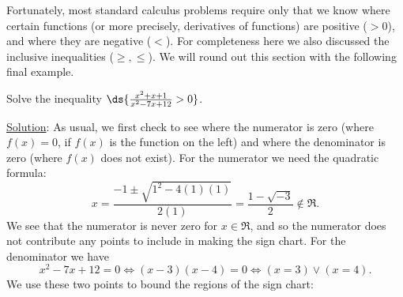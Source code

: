 %
\label{Example:SecondRational}
\eex

Fortunately, most standard calculus problems require only that
we know where certain functions (or more precisely, derivatives
of functions) are positive ($>0$), and where they are negative ($<$).
For completeness here we also discussed the inclusive
inequalities ($\ge,\le$).  We will round out this section with 
the following final example.

\bex Solve the inequality $\ds{\frac{x^2+x+1}{x^2-7x+12}>0}$.

\underline{Solution}: As usual, we first check to see where 
the numerator is zero (where $f(x)=0$, if $f(x)$ is the
function on the left) and where
the denominator is zero (where $f(x)$ does not exist).
For the numerator we need the quadratic formula:
$$x=\frac{-1\pm\sqrt{1^2-4(1)(1)}}{2(1)}=\frac{1-\sqrt{-3}}{2}
\not\in\Re.$$
We see that the numerator is never zero for $x\in\Re$, and
so the numerator does not contribute any points to include in
making the sign chart.  For the denominator we have
$$x^2-7x+12=0\iff(x-3)(x-4)=0\iff (x=3)\vee(x=4).$$
We use these two points to bound the regions of the sign 
chart:



